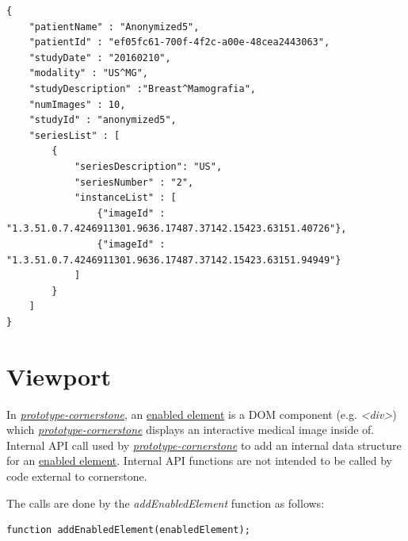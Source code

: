 \documentclass{tufte-book} %
\begin{document}
\begin{lstlisting}
{
    "patientName" : "Anonymized5",
    "patientId" : "ef05fc61-700f-4f2c-a00e-48cea2443063",
    "studyDate" : "20160210",
    "modality" : "US^MG",
    "studyDescription" :"Breast^Mamografia",
    "numImages" : 10,
    "studyId" : "anonymized5",
    "seriesList" : [
        {
            "seriesDescription": "US",
            "seriesNumber" : "2",
            "instanceList" : [
                {"imageId" : "1.3.51.0.7.4246911301.9636.17487.37142.15423.63151.40726"},
                {"imageId" : "1.3.51.0.7.4246911301.9636.17487.37142.15423.63151.94949"}
            ]
        }
    ]
}
\end{lstlisting}



\chapter{Viewport}

In \href{https://github.com/MIMBCD-UI/prototype-cornerstone}{\textit{prototype-cornerstone}}, an \href{https://github.com/cornerstonejs/cornerstone/wiki/enabled-element}{enabled element} is a DOM component (e.g. \textit{<div>}) which \href{https://github.com/MIMBCD-UI/prototype-cornerstone}{\textit{prototype-cornerstone}} displays an interactive medical image inside of. Internal API call used by \href{https://github.com/MIMBCD-UI/prototype-cornerstone}{\textit{prototype-cornerstone}} to add an internal data structure for an \href{https://github.com/cornerstonejs/cornerstone/wiki/enabled-element}{enabled element}. Internal API functions are not intended to be called by code external to cornerstone.

\hfill

The calls are done by the \textit{addEnabledElement} function as follows:

\hfill

\begin{lstlisting}
function addEnabledElement(enabledElement);
\end{lstlisting}
\end{document}
